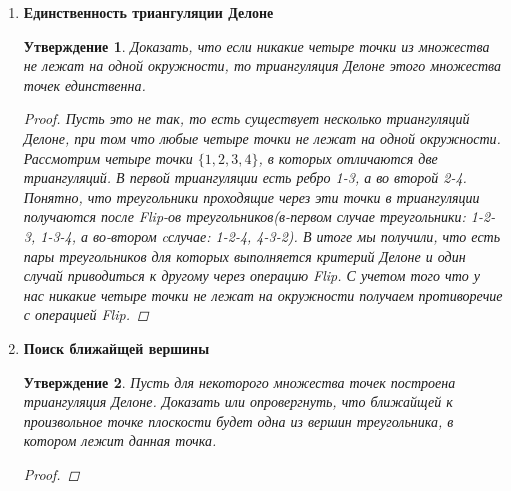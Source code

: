 \documentclass{article}
\theoremstyle{plain}
\newtheorem{statement}{Утверждение}[section]
\theoremstyle{definition}
\begin{document}
\begin{enumerate}
\item \textbf{Единственность триангуляции Делоне} 
\begin{statement} Доказать, что если никакие четыре точки из множества не лежат на одной окружности, то триангуляция Делоне этого множества точек единственна.  
\begin{proof} 
Пусть это не так, то есть существует несколько триангуляций Делоне, при том что любые четыре точки не лежат на одной окружности. 
Рассмотрим четыре точки $\{1, 2, 3, 4\}$, в которых отличаются две триангуляций. В первой триангуляции есть ребро 1-3, а во второй 2-4. 
Понятно, что треугольники проходящие через эти точки в триангуляции получаются после Flip-ов треугольников(в-первом случае треугольники: 1-2-3, 1-3-4, а во-втором cслучае: 1-2-4, 4-3-2). В итоге мы получили, что есть пары треугольников для которых выполняется критерий Делоне и один случай приводиться к другому через операцию Flip. С учетом того что у нас никакие четыре точки не лежат на окружности получаем противоречие с операцией Flip. 
\end{proof}
\end{statement}

\item \textbf{Поиск ближайщей вершины} 
\begin{statement} Пусть для некоторого множества точек построена триангуляция Делоне. Доказать или опровергнуть, что ближайщей к произвольное точке плоскости будет одна из вершин треугольника, в котором лежит данная точка.      
\begin{proof} 
\end{proof}
\end{statement}

\end{enumerate}
\end{document}
